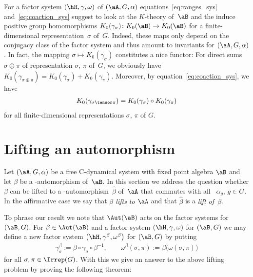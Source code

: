 \begin{Remark}\label{rem:K0_factor_sys}
For a factor system $(\hH, \gamma, \omega)$ of $(\aA,G,\alpha)$ equations~\eqref{eq:ranges_sys} and~\eqref{eq:coaction_sys} suggest to look at the $K$-theory of~$\aB$ and the induce positive group homomorphisms $K_0(\gamma_\sigma)\colon K_0(\aB) \to K_0(\aB)$ for a finite-dimensional representation~$\sigma$ of~$G$.
	Indeed, these maps only depend on the conjugacy class of the factor system and thus amount to invariants for $(\aA, G, \alpha)$.
	In fact, the mapping $\sigma \mapsto K_0(\gamma_\sigma)$ constitutes a nice functor:
	For direct sums $\sigma \oplus \pi$ of representation $\sigma$, $\pi$ of~$G$, we obviously have $K_0(\gamma_{\sigma \oplus \pi}) = K_0(\gamma_\sigma) + K_0(\gamma_\pi)$. Moreover, by equation~\eqref{eq:coaction_sys}, we have
	\begin{gather*}
		K_0(\gamma_{\sigma \tensor \pi}) = K_0(\gamma_\sigma) \circ K_0(\gamma_\pi)
	\end{gather*}
	for all finite-dimensional representations $\sigma$, $\pi$ of $G$.
\end{Remark}

\section{Lifting an automorphism}\label{sec:lift_automorphism}

Let $(\aA, G, \alpha)$ be a free C\Star-dynamical system with fixed point algebra $\aB$ and let $\beta$ be a \Star-auto\-mor\-phism of~$\aB$.
In this section we address the question whether $\beta$ can be lifted to a \Star-automorphism~$\hat \beta$ of~$\aA$ that commutes with all~ $\alpha_g$, $g \in G$.
In the affirmative case we say that \emph{$\beta$ lifts to $\aA$} and that $\hat \beta$ is a \emph{lift of~$\beta$}.

To phrase our result we note that $\Aut(\aB)$ acts on the factor systems for $(\aB,G)$.
For $\beta \in \Aut(\aB)$ and a factor system $(\hH, \gamma, \omega)$ for $(\aB,G)$ we may define a new factor system $\big(\hH, \gamma^\beta, \omega^\beta\big)$ for $(\aB,G)$ by putting
\begin{gather*}
	\gamma^\beta_\sigma
	:= \beta \circ \gamma_\sigma \circ \beta^{-1},
	\qquad
	\omega^\beta(\sigma, \pi)
	:= \beta \bigl( \omega(\sigma, \pi) \bigr)%
\end{gather*}
for all $\sigma, \pi \in \Irrep(G)$.
With this we give an answer to the above lifting problem by proving the following theorem:


